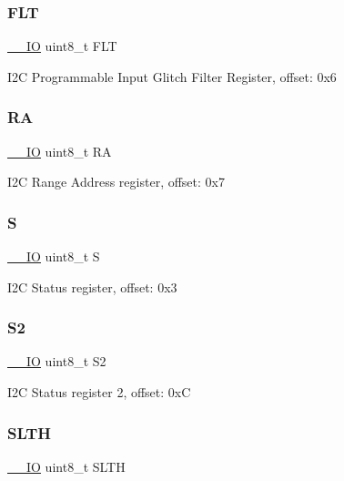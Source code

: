 \subsubsection{\texorpdfstring{FLT}{FLT}}
{\footnotesize\ttfamily \mbox{\hyperlink{core__cm0plus_8h_aec43007d9998a0a0e01faede4133d6be}{\+\_\+\+\_\+\+IO}} uint8\+\_\+t F\+LT}

I2C Programmable Input Glitch Filter Register, offset\+: 0x6 \mbox{\label{struct_i2_c___type_ae9dab8ef1aad113e4a4f83a1dc78e357}} 
\subsubsection{\texorpdfstring{RA}{RA}}
{\footnotesize\ttfamily \mbox{\hyperlink{core__cm0plus_8h_aec43007d9998a0a0e01faede4133d6be}{\+\_\+\+\_\+\+IO}} uint8\+\_\+t RA}

I2C Range Address register, offset\+: 0x7 \mbox{\label{struct_i2_c___type_a0542ffc7618a0893938748eef9c87474}} 
\subsubsection{\texorpdfstring{S}{S}}
{\footnotesize\ttfamily \mbox{\hyperlink{core__cm0plus_8h_aec43007d9998a0a0e01faede4133d6be}{\+\_\+\+\_\+\+IO}} uint8\+\_\+t S}

I2C Status register, offset\+: 0x3 \mbox{\label{struct_i2_c___type_aafdaf251d5cfeb18803536542a880459}} 
\subsubsection{\texorpdfstring{S2}{S2}}
{\footnotesize\ttfamily \mbox{\hyperlink{core__cm0plus_8h_aec43007d9998a0a0e01faede4133d6be}{\+\_\+\+\_\+\+IO}} uint8\+\_\+t S2}

I2C Status register 2, offset\+: 0xC \mbox{\label{struct_i2_c___type_ae84d7b4597381d16c807ac8c0f77b12c}} 
\subsubsection{\texorpdfstring{SLTH}{SLTH}}
{\footnotesize\ttfamily \mbox{\hyperlink{core__cm0plus_8h_aec43007d9998a0a0e01faede4133d6be}{\+\_\+\+\_\+\+IO}} uint8\+\_\+t S\+L\+TH}


